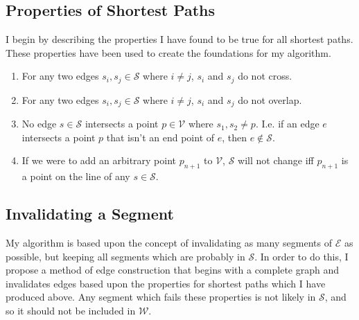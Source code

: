 \documentclass[12pt]{article}
\begin{document}
\subsection{Properties of Shortest Paths}\label{subsec:props}
I begin by describing the properties I have found to be true for all shortest
paths. These properties have been used to create the foundations for my algorithm.
\begin{enumerate}
\item For any two edges $s_i,s_j \in \mathcal{S}$ where
$i \neq j$, $s_i$ and $s_j$ do not cross. 
\item For any two edges $s_i,s_j \in \mathcal{S}$ where
$i \neq j$, $s_i$ and $s_j$ do not overlap. 
\item No edge $s \in \mathcal{S}$ intersects a point
$p \in \mathcal{V}$ where $s_1,s_2 \neq p$.
I.e. if an edge $e$ intersects a point $p$ that isn't an end point of $e$,
then $e \notin \mathcal{S}$.
\item If we were to add an arbitrary point $p_{n+1}$ to $\mathcal{V}$, $\mathcal{S}$
will not change iff $p_{n+1}$ is a point on the line of any $s \in \mathcal{S}$.
\end{enumerate}

\subsection{Invalidating a Segment}\label{subsec:invalid}
My algorithm is based upon the concept of invalidating as many segments of $\mathcal{E}$
as possible, but keeping all segments which are probably in $\mathcal{S}$.
In order to do this,
I propose a method of edge construction that begins with a complete graph
and invalidates edges based upon the
properties for shortest paths which I have produced
above. Any segment which fails these properties is not likely in $\mathcal{S}$,
and so it should not be included in $\mathcal{W}$.
\end{document}
